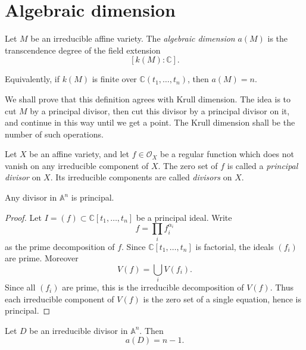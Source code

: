 \section{Algebraic dimension}
\label{section-algebraic-dimension}

\begin{definition}
\label{definition-algebraic-dimension}
Let $M$ be an irreducible affine variety.
The {\it algebraic dimension} $a(M)$
is the transcendence degree of the
field extension
$$
[k(M):\mathbb{C}].
$$
\end{definition}

\noindent
Equivalently, if $k(M)$ is finite over
$\mathbb{C}(t_1,\ldots,t_n)$,
then $a(M)=n$.

\medskip\noindent
We shall prove that this definition agrees
with Krull dimension.
The idea is to cut $M$ by a principal
divisor, then cut this divisor by a
principal divisor on it, and continue in
this way until we get a point.
The Krull dimension shall be the number
of such operations.

\begin{definition}
\label{definition-principal-divisor}
Let $X$ be an affine variety, and let
$f\in \mathcal{O}_X$ be a regular function
which does not vanish on any irreducible
component of $X$.
The zero set of $f$ is called a
{\it principal divisor} on $X$.
Its irreducible components are called
{\it divisors} on $X$.
\end{definition}

\begin{lemma}
\label{lemma-divisors-affine-space}
Any divisor in $\mathbb{A}^n$ is principal.
\end{lemma}

\begin{proof}
Let $I=(f)\subset \mathbb{C}[t_1,\ldots,t_n]$
be a principal ideal.
Write
$$
f=\prod_i f_i^{\alpha_i}
$$
as the prime decomposition of $f$.
Since $\mathbb{C}[t_1,\ldots,t_n]$
is factorial, the ideals $(f_i)$
are prime.
Moreover
$$
V(f)=\bigcup_i V(f_i).
$$
Since all $(f_i)$ are prime, this is the
irreducible decomposition of $V(f)$.
Thus each irreducible component of $V(f)$
is the zero set of a single equation,
hence is principal.
\end{proof}

\begin{lemma}
\label{lemma-algebraic-dimension-divisor}
Let $D$ be an irreducible divisor in
$\mathbb{A}^n$.
Then
$$
a(D)=n-1.
$$
\end{lemma}

